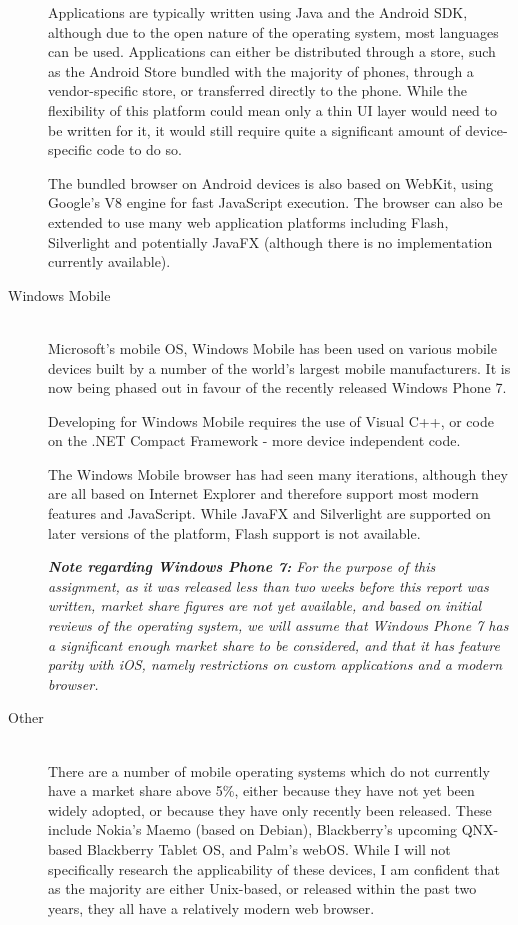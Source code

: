 \documentclass[a4papert,11pt,notitlepage]{article}
\begin{document}
\begin{appendices}
\begin{description}
Applications are typically written using Java and the Android SDK, although due to the open nature of the operating system, most languages can be used. Applications can either be distributed through a store, such as the Android Store bundled with the majority of phones, through a vendor-specific store, or transferred directly to the phone. While the flexibility of this platform could mean only a thin UI layer would need to be written for it, it would still require quite a significant amount of device-specific code to do so.

The bundled browser on Android devices is also based on WebKit, using Google's V8 engine for fast JavaScript execution. The browser can also be extended to use many web application platforms including Flash, Silverlight and potentially JavaFX (although there is no implementation currently available).

\item[Windows Mobile] \hfill \\
Microsoft's mobile OS, Windows Mobile\cite{winmo:web} has been used on various mobile devices built by a number of the world's largest mobile manufacturers. It is now being phased out in favour of the recently released Windows Phone 7.

Developing for Windows Mobile requires the use of Visual C++, or code on the .NET Compact Framework - more device independent code.

The Windows Mobile browser has had seen many iterations, although they are all based on Internet Explorer and therefore support most modern features and JavaScript. While JavaFX and Silverlight are supported on later versions of the platform, Flash support is not available.

{\it{\bf Note regarding Windows Phone 7:} For the purpose of this assignment, as it was released less than two weeks before this report was written, market share figures are not yet available, and based on initial reviews of the operating system, we will assume that Windows Phone 7 has a significant enough market share to be considered, and that it has feature parity with iOS, namely restrictions on custom applications and a modern browser.}

\item[Other] \hfill \\
There are a number of mobile operating systems which do not currently have a market share above 5\%, either because they have not yet been widely adopted, or because they have only recently been released. These include Nokia's Maemo (based on Debian), Blackberry's upcoming QNX-based Blackberry Tablet OS, and Palm's webOS. While I will not specifically research the applicability of these devices, I am confident that as the majority are either Unix-based, or released within the past two years, they all have a relatively modern web browser.


\end{description}
\end{appendices}
\end{document}
